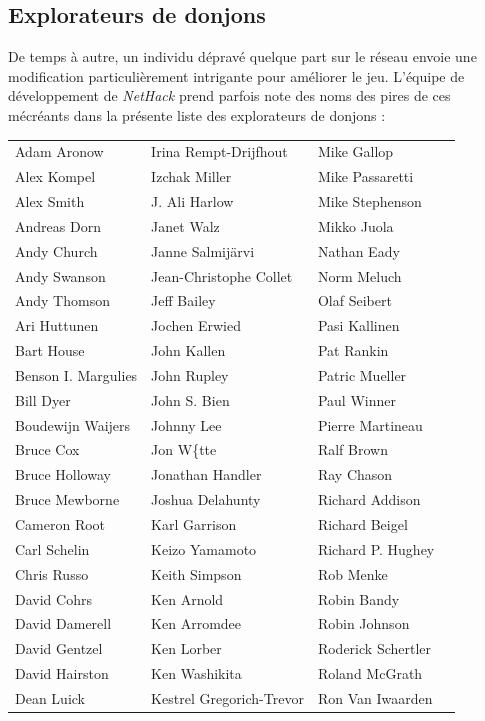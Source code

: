 \documentclass[titlepage]{article}
\begin{document}
\subsection*{Explorateurs de donjons}
\noindent De temps à autre, un individu dépravé quelque part sur le réseau envoie une
modification particulièrement intrigante pour améliorer le jeu.  L'équipe de
développement de \textit{NetHack} prend parfois note des noms des pires
de ces mécréants dans la présente liste des explorateurs de donjons :
\medskip
\begin{center}
\begin{tabular}{llll}
Adam Aronow & Irina Rempt-Drijfhout & Mike Gallop\\
Alex Kompel & Izchak Miller & Mike Passaretti\\
Alex Smith & J. Ali Harlow & Mike Stephenson\\
Andreas Dorn & Janet Walz & Mikko Juola\\
Andy Church & Janne Salmij\"{a}rvi & Nathan Eady\\
Andy Swanson & Jean-Christophe Collet & Norm Meluch\\
Andy Thomson & Jeff Bailey & Olaf Seibert\\
Ari Huttunen & Jochen Erwied & Pasi Kallinen\\
Bart House & John Kallen & Pat Rankin\\
Benson I. Margulies & John Rupley & Patric Mueller\\
Bill Dyer & John S. Bien & Paul Winner\\
Boudewijn Waijers & Johnny Lee & Pierre Martineau\\
Bruce Cox & Jon W\{tte & Ralf Brown\\
Bruce Holloway & Jonathan Handler & Ray Chason\\
Bruce Mewborne & Joshua Delahunty & Richard Addison\\
Cameron Root & Karl Garrison & Richard Beigel\\
Carl Schelin & Keizo Yamamoto & Richard P. Hughey\\
Chris Russo & Keith Simpson & Rob Menke\\
David Cohrs & Ken Arnold & Robin Bandy\\
David Damerell & Ken Arromdee & Robin Johnson\\
David Gentzel & Ken Lorber & Roderick Schertler\\
David Hairston & Ken Washikita & Roland McGrath\\
Dean Luick & Kestrel Gregorich-Trevor & Ron Van Iwaarden\\

\end{tabular}
\end{center}
\end{document}
